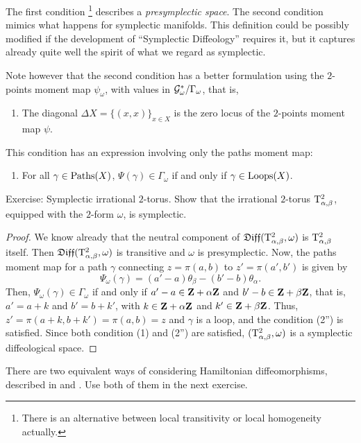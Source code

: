 The first condition%
\footnote{There is an alternative between local transitivity or local homogeneity actually.}
describes a \emph{presymplectic space}.
The second condition mimics what happens for symplectic manifolds.
This definition could be possibly modified if the development of ``Symplectic Diffeology'' requires it,
but it captures already quite well the spirit of what we regard as symplectic.

Note however that the second condition has a better formulation using the $2$-points moment map $\psi_\omega$,
with values in $\mathcal{G}_\omega^*/\Gamma_\omega$,
that is,
\begin{enumerate}
  \item[(2')] The diagonal $\Delta X = \{(x,x)\}_{x\in X}$ is the zero locus of the $2$-points moment map $\psi$.
\end{enumerate}
This condition has an expression involving only the paths moment map:
\begin{enumerate}
  \item[(2'')] For all $\gamma \in \operatorname{Paths}(X)$, $\Psi(\gamma) \in \Gamma_\omega$ if and only if $\gamma \in \operatorname{Loops}(X)$.
\end{enumerate}

\begin{Article}{Exercise: Symplectic irrational $2$-torus.}{}
  Show that the irrational $2$-torus $\mathrm{T}^2_{\alpha,\beta}$,
  equipped with the $2$-form $\omega$,
  is symplectic.
\end{Article}

\begin{proof}
  We know already that the neutral component of $\mathfrak{Diff}(\mathrm{T}^2_{\alpha,\beta},\omega)$ is $\mathrm{T}^2_{\alpha,\beta}$ itself.
  Then $\mathfrak{Diff}(\mathrm{T}^2_{\alpha,\beta},\omega)$ is transitive and $\omega$ is presymplectic.
  Now,
  the paths moment map for a path $\gamma$ connecting $z=\pi(a,b)$ to $z'=\pi(a',b')$ is given by
  $$%
    \Psi_\omega(\gamma) = (a'-a)\theta_\beta-(b'-b)\theta_\alpha.
    $$%
  Then,
  $\Psi_\omega(\gamma) \in \Gamma_\omega$ if and only if $a'-a \in \mathbf{Z}+\alpha\mathbf{Z}$ and $b'-b \in \mathbf{Z}+\beta\mathbf{Z}$,
  that is,
  $a'=a + k$ and $b'=b+k'$,
  with $k \in \mathbf{Z}+\alpha\mathbf{Z}$ and $k' \in \mathbf{Z}+\beta\mathbf{Z}$.
  Thus,
  $z'=\pi(a+k,b+k')= \pi(a,b)=z$
  and $\gamma$ is a loop,
  and the condition (2'') is satisfied.
  Since both condition (1) and (2'') are satisfied,
  $(\mathrm{T}^2_{\alpha,\beta},\omega)$ is a symplectic diffeological space.
\end{proof}

There are two equivalent ways of considering Hamiltonian diffeomorphisms,
described in \cite[\textsection\,9.15]{PIZ13} and \cite[\textsection\,9.16]{PIZ13}.
Use both of them in the next exercise.

